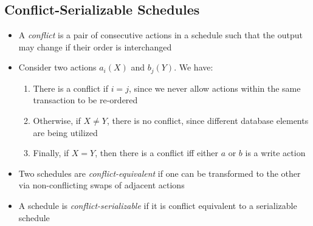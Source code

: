 \documentclass[a4paper]{article}
\begin{document}
\subsection{Conflict-Serializable Schedules}
\begin{itemize}
    \item A \emph{conflict} is a pair of consecutive actions in a schedule such that the output may change if their order is interchanged
    \item Consider two actions $a_i(X)$ and $b_j(Y)$. We have:
    \begin{enumerate}[label=(\roman*)]
        \item There is a conflict if $i=j$, since we never allow actions within the same transaction to be re-ordered
        \item Otherwise, if $X\neq Y$, there is no conflict, since different database elements are being utilized
        \item Finally, if $X=Y$, then there is a conflict iff either $a$ or $b$ is a write action
    \end{enumerate}
    \item Two schedules are \emph{conflict-equivalent} if one can be transformed to the other via non-conflicting swaps of adjacent actions
    \item A schedule is \emph{conflict-serializable} if it is conflict equivalent to a serializable schedule
    \begin{arrows}

\end{arrows}
\end{itemize}
\end{document}
